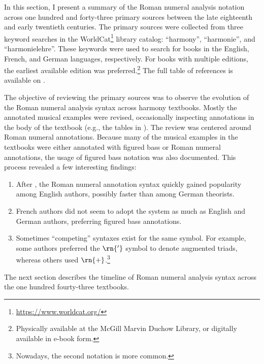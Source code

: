In this section, I present a summary of the Roman numeral
analysis notation across one hundred and forty-three primary
sources between the late eighteenth and early twentieth
centuries. The primary sources were collected from three
keyword searches in the
WorldCat\footnote{\href{https://www.worldcat.org/}{https://www.worldcat.org/}}
library catalog: ``harmony'', ``harmonie'', and
``harmonielehre''. These keywords were used to search for
books in the English, French, and German languages,
respectively. For books with multiple editions, the earliest
available edition was preferred.\footnote{Physically
available at the McGill Marvin Duchow Library, or digitally
available in e-book form.} The full table of references is available on .



The objective of reviewing the primary sources was to
observe the evolution of the Roman numeral analysis syntax
across harmony textbooks. Mostly the annotated musical
examples were revised, occasionally inspecting annotations
in the body of the textbook (e.g., the tables in
\textcite{kirnberger1774kunst}). The review was centered
around Roman numeral annotations. Because many of the
musical examples in the textbooks were either annotated with
figured bass or Roman numeral annotations, the usage of
figured bass notation was also documented. This process
revealed a few interesting findings:

\begin{enumerate}
    \item After \textcite{weber1817versuch}, the Roman
    numeral annotation syntax quickly gained popularity
    among English authors, possibly faster than among German
    theorists.
    \item French authors did not seem to adopt the system as
    much as English and German authors, preferring figured
    bass annotations.
    \item Sometimes ``competing'' syntaxes exist for the
    same symbol. For example, some authors preferred the
    $\rn{'}$ symbol to denote augmented triads, whereas
    others used $\rn{+}$.\footnote{Nowadays, the second
    notation is more common.}
\end{enumerate}

The next section describes the timeline of Roman numeral
analysis syntax across the one hundred fourty-three
textbooks.
